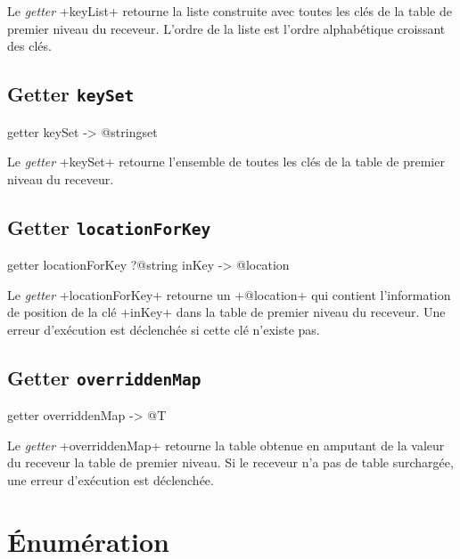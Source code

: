 Le \emph{getter} \ggs+keyList+ retourne la liste construite avec toutes les clés de la table de premier niveau du receveur. L'ordre de la liste est l'ordre alphabétique croissant des clés.



\subsection{Getter \texttt{keySet}}

\begin{galgas}
getter keySet -> @stringset
\end{galgas}


Le \emph{getter} \ggs+keySet+ retourne l'ensemble de toutes les clés de la table de premier niveau du receveur.





\subsection{Getter \texttt{locationForKey}}

\begin{galgas}
getter locationForKey ?@string inKey -> @location
\end{galgas}


Le \emph{getter} \ggs+locationForKey+ retourne un \ggs+@location+ qui contient l'information de position de la clé \ggs+inKey+ dans la table de premier niveau du receveur. Une erreur d'exécution est déclenchée si cette clé n'existe pas.








\subsection{Getter \texttt{overriddenMap}}

\begin{galgas}
getter overriddenMap -> @T
\end{galgas}


Le \emph{getter} \ggs+overriddenMap+ retourne la table obtenue en amputant de la valeur du receveur la table de premier niveau. Si le receveur n'a pas de table surchargée, une erreur d'exécution est déclenchée.





\section{Énumération}


